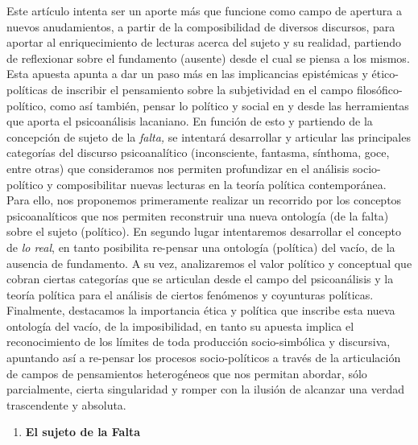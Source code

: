 \documentclass{book}
\begin{document}
Este artículo intenta ser un aporte más que funcione como campo de
apertura a nuevos anudamientos, a partir de la composibilidad de
diversos discursos, para aportar al enriquecimiento de lecturas acerca
del sujeto y su realidad, partiendo de reflexionar sobre el fundamento
(ausente) desde el cual se piensa a los mismos. Esta apuesta apunta a
dar un paso más en las implicancias epistémicas y ético-políticas de
inscribir el pensamiento sobre la subjetividad en el campo
filosófico-político, como así también, pensar lo político y social en y
desde las herramientas que aporta el psicoanálisis lacaniano. En función
de esto y partiendo de la concepción de sujeto de la \emph{falta,} se
intentará desarrollar y articular las principales categorías del
discurso psicoanalítico (inconsciente, fantasma, sínthoma, goce, entre
otras) que consideramos nos permiten profundizar en el análisis
socio-político y composibilitar nuevas lecturas en la teoría política
contemporánea. Para ello, nos proponemos primeramente realizar un
recorrido por los conceptos psicoanalíticos que nos permiten reconstruir
una nueva ontología (de la falta) sobre el sujeto (político). En segundo
lugar intentaremos desarrollar el concepto de \emph{lo real}, en tanto
posibilita re-pensar una ontología (política) del vacío, de la ausencia
de fundamento. A su vez, analizaremos el valor político y conceptual que
cobran ciertas categorías que se articulan desde el campo del
psicoanálisis y la teoría política para el análisis de ciertos fenómenos
y coyunturas políticas. Finalmente, destacamos la importancia ética y
política que inscribe esta nueva ontología del vacío, de la
imposibilidad, en tanto su apuesta implica el reconocimiento de los
límites de toda producción socio-simbólica y discursiva, apuntando así a
re-pensar los procesos socio-políticos a través de la articulación de
campos de pensamientos heterogéneos que nos permitan abordar, sólo
parcialmente, cierta singularidad y romper con la ilusión de alcanzar
una verdad trascendente y absoluta.

\begin{enumerate}
\def\labelenumi{\arabic{enumi}.}
\setcounter{enumi}{1}
\item
  \textbf{El sujeto de la Falta}
\end{enumerate}
\end{document}
